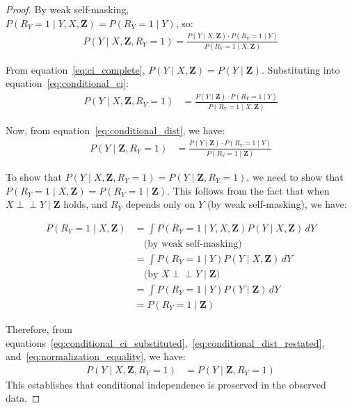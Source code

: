 \documentclass[runningheads]{llncs}
\begin{document}
\begin{proof}
By weak self-masking, \\$P(R_Y = 1 \mid Y, X, \mathbf{Z}) = P(R_Y = 1 \mid Y)$, so:
\begin{align}
P(Y \mid X, \mathbf{Z}, R_Y = 1) = \frac{P(Y \mid X, \mathbf{Z}) \cdot P(R_Y = 1 \mid Y)}{P(R_Y = 1 \mid X, \mathbf{Z})} \label{eq:conditional_ci}
\end{align}

From equation~\eqref{eq:ci_complete}, $P(Y \mid X, \mathbf{Z}) = P(Y \mid \mathbf{Z})$. Substituting into equation~\eqref{eq:conditional_ci}:
\begin{align}
P(Y \mid X, \mathbf{Z}, R_Y = 1) &= \frac{P(Y \mid \mathbf{Z}) \cdot P(R_Y = 1 \mid Y)}{P(R_Y = 1 \mid X, \mathbf{Z})} \label{eq:conditional_ci_substituted}
\end{align}

Now, from equation~\eqref{eq:conditional_dist}, we have:
\begin{align}
P(Y \mid \mathbf{Z}, R_Y = 1) &= \frac{P(Y \mid \mathbf{Z}) \cdot P(R_Y = 1 \mid Y)}{P(R_Y = 1 \mid \mathbf{Z})} \label{eq:conditional_dist_restated}
\end{align}

To show that $P(Y \mid X, \mathbf{Z}, R_Y = 1) = P(Y \mid \mathbf{Z}, R_Y = 1)$, we need to show that $P(R_Y = 1 \mid X, \mathbf{Z}) = P(R_Y = 1 \mid \mathbf{Z})$. This follows from the fact that when $X \perp\!\!\!\perp Y \mid \mathbf{Z}$ holds, and $R_Y$ depends only on $Y$ (by weak self-masking), we have:

\begin{align}
P(R_Y = 1 \mid X, \mathbf{Z})
&= \int P(R_Y = 1 \mid Y, X, \mathbf{Z}) 
     P(Y \mid X, \mathbf{Z}) \, dY \nonumber \\
&\quad \text{(by weak self-masking)} \nonumber \\
&= \int P(R_Y = 1 \mid Y) 
     P(Y \mid X, \mathbf{Z}) \, dY \nonumber \\
&\quad \text{(by } X \perp\!\!\!\perp Y \mid \mathbf{Z} \text{)} \nonumber \\
&= \int P(R_Y = 1 \mid Y) 
     P(Y \mid \mathbf{Z}) \, dY \nonumber \\
&= P(R_Y = 1 \mid \mathbf{Z})
\label{eq:normalization_equality}
\end{align}


Therefore, from equations~\eqref{eq:conditional_ci_substituted},~\eqref{eq:conditional_dist_restated}, and~\eqref{eq:normalization_equality}, we have:
\begin{align}
P(Y \mid X, \mathbf{Z}, R_Y = 1) &= P(Y \mid \mathbf{Z}, R_Y = 1) \label{eq:ci_preserved}
\end{align}
This establishes that conditional independence is preserved in the observed data.


\end{proof}
\end{document}
